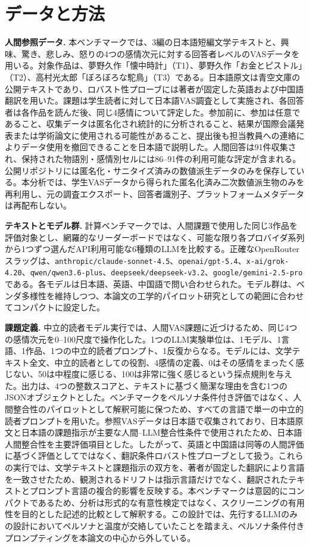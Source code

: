 \documentclass[lualatex,ja=standard,a4paper,11pt]{bxjsarticle}
\begin{document}
\section{データと方法}

\textbf{人間参照データ.}
本ベンチマークでは、3編の日本語短編文学テキストと、興味、驚き、悲しみ、怒りの4つの感情次元に対する回答者レベルのVASデータを用いる。対象作品は、夢野久作「懐中時計」（T1）、夢野久作「お金とピストル」（T2）、高村光太郎「ぼろぼろな駝鳥」（T3）である。日本語原文は青空文庫の公開テキストであり、ロバスト性プローブには著者が固定した英語および中国語翻訳を用いた\cite{aozora}。課題は学生読者に対して日本語VAS調査として実施され、各回答者は各作品を読んだ後、同じ4感情について評定した。参加前に、参加は任意であること、収集データは匿名化され統計的に分析されること、結果が国際会議発表または学術論文に使用される可能性があること、提出後も担当教員への連絡によりデータ使用を撤回できることを日本語で説明した。人間回答は91件収集され、保持された物語別・感情別セルには86--91件の利用可能な評定が含まれる。公開リポジトリには匿名化・サニタイズ済みの数値派生データのみを保存している。本分析では、学生VASデータから得られた匿名化済み二次数値派生物のみを再利用し、元の調査エクスポート、回答者識別子、プラットフォームメタデータは再配布しない。

\textbf{テキストとモデル群.}
計算ベンチマークでは、人間課題で使用した同じ3作品を評価対象とし、網羅的なリーダーボードではなく、可能な限り各プロバイダ系列から1つずつ選んだAPI利用可能な6種類のLLMを比較する。正確なOpenRouterスラッグは、\texttt{anthropic/claude-sonnet-4.5}、\texttt{openai/gpt-5.4}、\texttt{x-ai/grok-4.20}、\texttt{qwen/qwen3.6-plus}、\texttt{deepseek/deepseek-v3.2}、\texttt{google/gemini-2.5-pro}である。各モデルは日本語、英語、中国語で問い合わせられた。モデル群は、ベンダ多様性を維持しつつ、本論文の工学的パイロット研究としての範囲に合わせてコンパクトに設定した。

\textbf{課題定義.}
中立的読者モデル実行では、人間VAS課題に近づけるため、同じ4つの感情次元を0--100尺度で操作化した。1つのLLM実験単位は、1モデル、1言語、1作品、1つの中立的読者プロンプト、1反復からなる。モデルには、文学テキスト全文、中立的読者としての役割、4感情の定義、0はその感情をまったく感じない、50は中程度に感じる、100は非常に強く感じるという採点規則を与えた。出力は、4つの整数スコアと、テキストに基づく簡潔な理由を含む1つのJSONオブジェクトとした。ベンチマークをペルソナ条件付き評価ではなく、人間整合性のパイロットとして解釈可能に保つため、すべての言語で単一の中立的読者プロンプトを用いた。参照VASデータは日本語で収集されており、日本語原文と日本語の課題指示が主要な人間--LLM整合性条件で使用されたため、日本語人間整合性を主要評価項目とした。したがって、英語と中国語は同等の人間評価に基づく評価としてではなく、翻訳条件ロバスト性プローブとして扱う。これらの実行では、文学テキストと課題指示の双方を、著者が固定した翻訳により言語を一致させたため、観測されるドリフトは指示言語だけでなく、翻訳されたテキストとプロンプト言語の複合的影響を反映する。本ベンチマークは意図的にコンパクトであるため、分析は形式的な有意性検定ではなく、スクリーニングの有用性を目的とした記述的比較として解釈する。この設計では、先行するLLMのみの設計においてペルソナと温度が交絡していたことを踏まえ\cite{shirahama2026mdpi}、ペルソナ条件付きプロンプティングを本論文の中心から外している。
\end{document}
